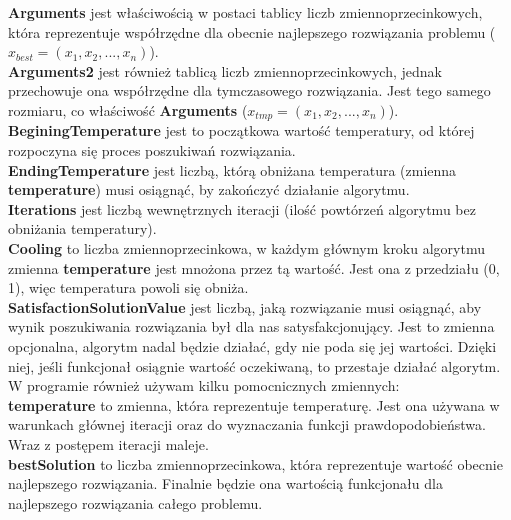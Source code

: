 \documentclass[twoside]{projektInzynierskiMS1}
\newcommand{\si}{ś}
\begin{document}
\textbf{Arguments} jest wła\si ciwo\si cią w postaci tablicy liczb zmiennoprzecinkowych, która reprezentuje współrzędne dla obecnie najlepszego rozwiązania problemu ($x_{best} = (x_1, x_2, ..., x_n)$). \\

\textbf{Arguments2} jest również tablicą liczb zmiennoprzecinkowych, jednak przechowuje ona współrzędne dla tymczasowego rozwiązania. Jest tego samego rozmiaru, co wła\si ciwo\si ć \textbf{Arguments} ($x_{tmp} = (x_1, x_2, ..., x_n)$). \\

\textbf{BeginingTemperature} jest to początkowa warto\si ć temperatury, od której rozpoczyna się proces poszukiwań rozwiązania. \\ 

\textbf{EndingTemperature} jest liczbą, którą obniżana temperatura (zmienna \textbf{temperature}) musi osiągnąć, by zakończyć działanie algorytmu. \\

\textbf{Iterations} jest liczbą wewnętrznych iteracji (ilo\si ć powtórzeń algorytmu bez obniżania temperatury). \\

\textbf{Cooling} to liczba zmiennoprzecinkowa, w każdym głównym kroku algorytmu zmienna \textbf{temperature} jest mnożona przez tą warto\si ć. Jest ona z przedziału (0, 1), więc temperatura powoli się obniża. \\

\textbf{SatisfactionSolutionValue} jest liczbą, jaką rozwiązanie musi osiągnąć, aby wynik poszukiwania rozwiązania był dla nas satysfakcjonujący. Jest to zmienna opcjonalna, algorytm nadal będzie działać, gdy nie poda się jej warto\si ci. Dzięki niej, je\si li funkcjonał osiągnie warto\si ć oczekiwaną, to przestaje działać algorytm.\\

W programie również używam kilku pomocnicznych zmiennych: \\

\textbf{temperature} to zmienna, która reprezentuje temperaturę. Jest ona używana w warunkach głównej iteracji oraz do wyznaczania funkcji prawdopodobieństwa. Wraz z postępem iteracji maleje. \\

\textbf{bestSolution} to liczba zmiennoprzecinkowa, która reprezentuje warto\si ć obecnie najlepszego rozwiązania. Finalnie będzie ona warto\si cią funkcjonału dla najlepszego rozwiązania całego problemu. \\
\end{document}
